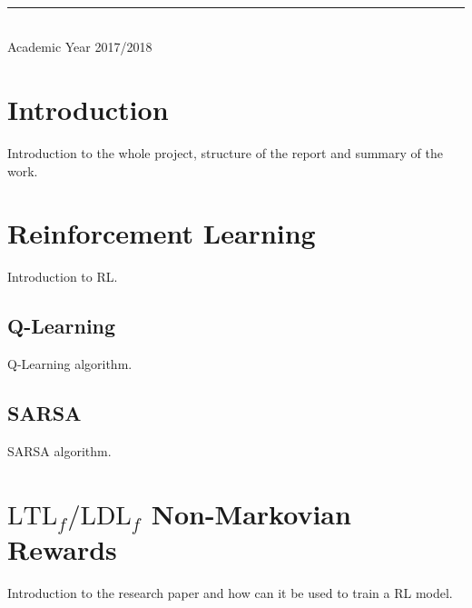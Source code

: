 \documentclass[a4paper]{article}
\begin{document}
\begin{titlepage}
\begin{minipage}{0.4\textwidth}
	\end{minipage}\\[2 cm]

    \vspace{0.2cm}
    \rule{\linewidth}{0.2 mm} \\[0.3 cm]
    \vspace*{-0.3cm}
    Academic Year 2017/2018
\end{titlepage}

\tableofcontents
\newpage




\section{Introduction}
Introduction to the whole project, structure of the report and summary of
the work.

\clearpage
\section{Reinforcement Learning}
Introduction to RL.

\subsection{Q-Learning}
Q-Learning algorithm.

\subsection{SARSA}
SARSA algorithm.

\clearpage
\section{$\text{LTL}_f/\text{LDL}_f$ Non-Markovian Rewards}
Introduction to the research paper and how can it be used to train
a RL model.
\end{document}
